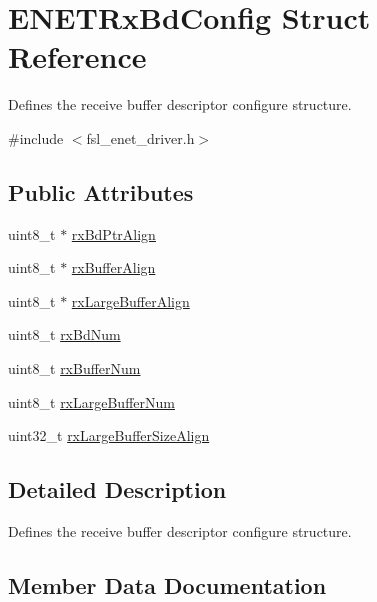 \hypertarget{structENETRxBdConfig}{}\section{E\+N\+E\+T\+Rx\+Bd\+Config Struct Reference}
\label{structENETRxBdConfig}


Defines the receive buffer descriptor configure structure.  




{\ttfamily \#include $<$fsl\+\_\+enet\+\_\+driver.\+h$>$}

\subsection*{Public Attributes}
\begin{DoxyCompactItemize}
\item 
uint8\+\_\+t $\ast$ \hyperlink{structENETRxBdConfig_ab4ebbd55ffb2e447c30b153f4b142d69}{rx\+Bd\+Ptr\+Align}
\item 
uint8\+\_\+t $\ast$ \hyperlink{structENETRxBdConfig_a437f8e078205842ce84ce6ae1739d476}{rx\+Buffer\+Align}
\item 
uint8\+\_\+t $\ast$ \hyperlink{structENETRxBdConfig_a9b538f79a2e1e4f4bdf4eedb91547482}{rx\+Large\+Buffer\+Align}
\item 
uint8\+\_\+t \hyperlink{structENETRxBdConfig_ae1752824f72b72c59be678487a2da34c}{rx\+Bd\+Num}
\item 
uint8\+\_\+t \hyperlink{structENETRxBdConfig_a69ff7bc55a2cafd74c2d8bcdf58a646a}{rx\+Buffer\+Num}
\item 
uint8\+\_\+t \hyperlink{structENETRxBdConfig_a846425f94a3995cbbda6f9c6eab3d526}{rx\+Large\+Buffer\+Num}
\item 
uint32\+\_\+t \hyperlink{structENETRxBdConfig_a23fc2ecb950f5d7fb28043c6308ace55}{rx\+Large\+Buffer\+Size\+Align}
\end{DoxyCompactItemize}


\subsection{Detailed Description}
Defines the receive buffer descriptor configure structure. 

\subsection{Member Data Documentation}
